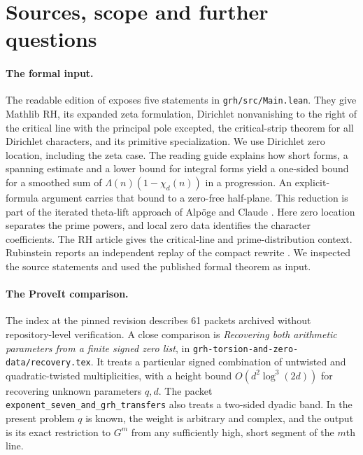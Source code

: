 \documentclass[11pt,letterpaper]{article}
\begin{document}
\section{Sources, scope and further questions}
\paragraph{The formal input.}
The readable edition of \cite{lean} exposes five statements in \texttt{grh/src/Main.lean}. They give Mathlib RH, its expanded zeta formulation, Dirichlet nonvanishing to the right of the critical line with the principal pole excepted, the critical-strip theorem for all Dirichlet characters, and its primitive specialization. We use Dirichlet zero location, including the zeta case. The reading guide explains how short forms, a spanning estimate and a lower bound for integral forms yield a one-sided bound for a smoothed sum of $\Lambda(n)(1-\chi_d(n))$ in a progression. An explicit-formula argument carries that bound to a zero-free half-plane. This reduction is part of the iterated theta-lift approach of Alp\"oge and Claude \cite{alpoge}. Here zero location separates the prime powers, and local zero data identifies the character coefficients. The RH article \cite{wiki} gives the critical-line and prime-distribution context. Rubinstein reports an independent replay of the compact rewrite \cite{replay}. We inspected the source statements and used the published formal theorem as input.

\paragraph{The ProveIt comparison.}
The index at the pinned revision \cite{proveit} describes 61 packets archived without repository-level verification. A close comparison is \emph{Recovering both arithmetic parameters from a finite signed zero list}, in \texttt{grh-torsion-and-zero-data/recovery.tex}. It treats a particular signed combination of untwisted and quadratic-twisted multiplicities, with a height bound $O(d^2\log^3(2d))$ for recovering unknown parameters $q,d$. The packet \texttt{exponent\_seven\_and\_grh\_transfers} also treats a two-sided dyadic band. In the present problem $q$ is known, the weight is arbitrary and complex, and the output is its exact restriction to $G^m$ from any sufficiently high, short segment of the $m$th line.
\end{document}
